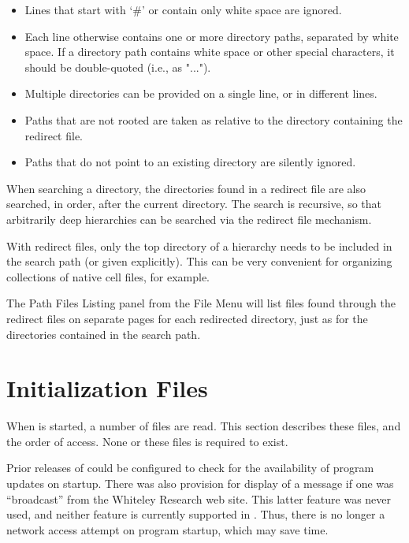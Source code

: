 \begin{itemize}
\begin{itemize}
\item{Lines that start with `{\vt \#}' or contain only white space
  are ignored.}
\item{Each line otherwise contains one or more directory paths,
  separated by white space.  If a directory path contains white
  space or other special characters, it should be double-quoted
  (i.e., as {\vt "..."}).}
\item{Multiple directories can be provided on a single line, or in
  different lines.}
\item{Paths that are not rooted are taken as relative to the
  directory containing the redirect file.}
\item{Paths that do not point to an existing directory are silently
  ignored.}
\end{itemize}

When searching a directory, the directories found in a redirect file
are also searched, in order, after the current directory.  The search
is recursive, so that arbitrarily deep hierarchies can be searched via
the redirect file mechanism.

With redirect files, only the top directory of a hierarchy needs to be
included in the search path (or given explicitly).  This can be very
convenient for organizing collections of native cell files, for
example.

The {\cb Path Files Listing} panel from the {\cb File Menu} will list
files found through the redirect files on separate pages for each
redirected directory, just as for the directories contained in the
search path.


\section{Initialization Files}

When {\Xic} is started, a number of files are read.  This section
describes these files, and the order of access.  None or these files
is required to exist.

Prior releases of {\Xic} could be configured to check for the
availability of program updates on startup.  There was also provision
for display of a message if one was ``broadcast'' from the Whiteley
Research web site.  This latter feature was never used, and neither
feature is currently supported in {\Xic}.  Thus, there is no longer a
network access attempt on program startup, which may save time.


\end{itemize}
